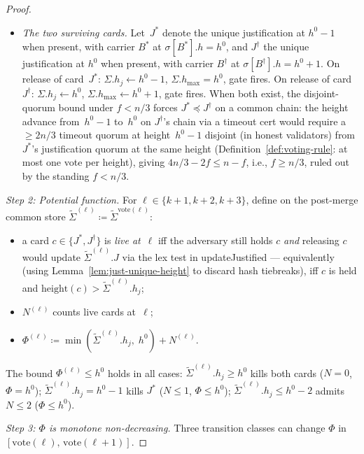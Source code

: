 \documentclass{article}
\newcommand{\hmax}{\ensuremath{h_{\max}}\xspace}
\newcommand{\vote}{\ensuremath{\mathrm{vote}}}
\newcommand{\comm}[1]{\ensuremath{\widetilde{#1}}}
\newcommand{\updateJustified}{\textsf{updateJustified}\xspace}
\theoremstyle{plain}
\theoremstyle{definition}
\theoremstyle{remark}
\begin{document}
\begin{proof}
\begin{itemize}
  \item\emph{The two surviving cards.}
  Let~$J^*$ denote the unique justification at $h^0 - 1$ when present, with carrier $B^*$ at $\sigma[B^*].h = h^0$, and $J^\dagger$ the unique justification at $h^0$ when present, with carrier $B^\dagger$ at $\sigma[B^\dagger].h = h^0 + 1$.
  On release of card~$J^*$: $\Sigma.h_j \gets h^0 - 1$, $\Sigma.\hmax = h^0$, gate fires.
  On release of card~$J^\dagger$: $\Sigma.h_j \gets h^0$, $\Sigma.\hmax \gets h^0 + 1$, gate fires.
  When both exist, the disjoint-quorum bound under $f < n/3$ forces $J^* \preceq J^\dagger$ on a common chain: the height advance from~$h^0 - 1$ to~$h^0$ on $J^\dagger$'s chain via a timeout cert would require a $\geq 2n/3$ timeout quorum at height~$h^0 - 1$ disjoint (in honest validators) from $J^*$'s justification quorum at the same height (Definition~\ref{def:voting-rule}: at most one vote per height), giving $4n/3 - 2f \leq n - f$, i.e., $f \geq n/3$, ruled out by the standing $f < n/3$.
\end{itemize}

\emph{Step 2: Potential function.}
For $\ell \in \{k+1, k+2, k+3\}$, define on the post-merge common store $\comm{\Sigma}^{(\ell)} \coloneqq \comm{\Sigma}^{\vote(\ell)}$:
\begin{itemize}
  \item a card $c \in \{J^*, J^\dagger\}$ is \emph{live at}~$\ell$ iff the adversary still holds $c$ \emph{and} releasing $c$ would update $\comm{\Sigma}^{(\ell)}.J$ via the lex test in \updateJustified{} --- equivalently (using Lemma~\ref{lem:just-unique-height} to discard hash tiebreaks), iff $c$ is held and $\mathrm{height}(c) > \comm{\Sigma}^{(\ell)}.h_j$;
  \item $N^{(\ell)}$ counts live cards at~$\ell$;
  \item $\Phi^{(\ell)} \coloneqq \min(\comm{\Sigma}^{(\ell)}.h_j,\; h^0) + N^{(\ell)}$.
\end{itemize}

The bound $\Phi^{(\ell)} \leq h^0$ holds in all cases:
$\comm{\Sigma}^{(\ell)}.h_j \geq h^0$ kills both cards ($N = 0$, $\Phi = h^0$); $\comm{\Sigma}^{(\ell)}.h_j = h^0 - 1$ kills $J^*$ ($N \leq 1$, $\Phi \leq h^0$); $\comm{\Sigma}^{(\ell)}.h_j \leq h^0 - 2$ admits $N \leq 2$ ($\Phi \leq h^0$).

\emph{Step 3: $\Phi$ is monotone non-decreasing.}
Three transition classes can change $\Phi$ in $[\vote(\ell),\, \vote(\ell+1)]$.


\end{proof}
\end{document}
